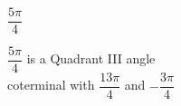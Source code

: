 {$\dfrac{5\pi}{4}$}
{$\dfrac{5\pi}{4}$ is a Quadrant III angle\\
coterminal with $\dfrac{13\pi}{4}$ and $-\dfrac{3\pi}{4}$

\begin{center}
\end{center}}